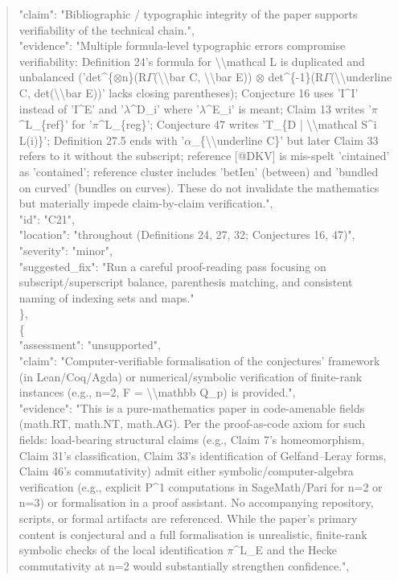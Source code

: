 \documentclass[11pt]{article}
\begin{document}
\begin{quote}
      "claim": "Bibliographic / typographic integrity of the paper supports verifiability of the technical chain.",\\
      "evidence": "Multiple formula-level typographic errors compromise verifiability: Definition 24's formula for \textbackslash{}\textbackslash{}mathcal L is duplicated and unbalanced ('det\^{}\{\ensuremath{\otimes}n\}(R\ensuremath{\Gamma}(\textbackslash{}\textbackslash{}bar C, \textbackslash{}\textbackslash{}bar E)) \ensuremath{\otimes} det\^{}\{-1\}(R\ensuremath{\Gamma}(\textbackslash{}\textbackslash{}underline C, det(\textbackslash{}\textbackslash{}bar E))' lacks closing parentheses); Conjecture 16 uses 'I\^{}I' instead of 'I\^{}E' and '\ensuremath{\lambda}\^{}D\_i' where '\ensuremath{\lambda}\^{}E\_i' is meant; Claim 13 writes '\ensuremath{\pi}\^{}L\_\{ref\}' for '\ensuremath{\pi}\^{}L\_\{reg\}'; Conjecture 47 writes 'T\_\{D | \textbackslash{}\textbackslash{}mathcal S\^{}i L(i)\}'; Definition 27.5 ends with '\ensuremath{\alpha}\_\{\textbackslash{}\textbackslash{}underline C\}' but later Claim 33 refers to it without the subscript; reference [@DKV] is mis-spelt 'cintained' as 'contained'; reference cluster includes 'betIen' (between) and 'bundled on curved' (bundles on curves). These do not invalidate the mathematics but materially impede claim-by-claim verification.",\\
      "id": "C21",\\
      "location": "throughout (Definitions 24, 27, 32; Conjectures 16, 47)",\\
      "severity": "minor",\\
      "suggested\_fix": "Run a careful proof-reading pass focusing on subscript/superscript balance, parenthesis matching, and consistent naming of indexing sets and maps."\\
    \},\\
    \{\\
      "assessment": "unsupported",\\
      "claim": "Computer-verifiable formalisation of the conjectures' framework (in Lean/Coq/Agda) or numerical/symbolic verification of finite-rank instances (e.g., n=2, F = \textbackslash{}\textbackslash{}mathbb Q\_p) is provided.",\\
      "evidence": "This is a pure-mathematics paper in code-amenable fields (math.RT, math.NT, math.AG). Per the proof-as-code axiom for such fields: load-bearing structural claims (e.g., Claim 7's homeomorphism, Claim 31's classification, Claim 33's identification of Gelfand--Leray forms, Claim 46's commutativity) admit either symbolic/computer-algebra verification (e.g., explicit P\^{}1 computations in SageMath/Pari for n=2 or n=3) or formalisation in a proof assistant. No accompanying repository, scripts, or formal artifacts are referenced. While the paper's primary content is conjectural and a full formalisation is unrealistic, finite-rank symbolic checks of the local identification \ensuremath{\pi}\^{}L\_E and the Hecke commutativity at n=2 would substantially strengthen confidence.",\\

\end{quote}
\end{document}
